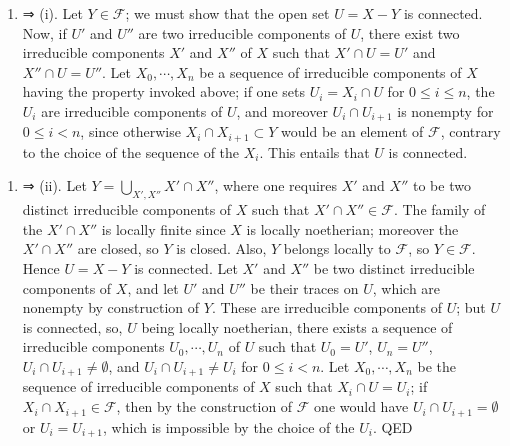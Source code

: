 \documentclass[
  11pt,
  a4paper,
]{book}
\newcounter{none} %
\providecommand{\tightlist}{%
  \setlength{\itemsep}{0pt}\setlength{\parskip}{0pt}}
\begin{document}
\begin{enumerate}
\def\labelenumi{(\roman{enumi})}
\setcounter{enumi}{1}
\tightlist
\item
  ⇒ (i). Let \(Y \in \mathcal{F}\); we must show that the open set
  \(U = X - Y\) is connected. Now, if \(U'\) and \(U''\) are two
  irreducible components of \(U\), there exist two irreducible
  components \(X'\) and \(X''\) of \(X\) such that \(X' \cap U =
  U'\) and \(X'' \cap U = U''\). Let \(X_{0}, \cdots, X_{n}\) be a
  sequence of irreducible components of \(X\) having the property
  invoked above; if one sets \(U_{i} = X_{i} \cap U\) for
  \(0 \leqslant i \leqslant n\), the \(U_{i}\) are irreducible
  components of \(U\), and moreover \(U_{i} \cap U_{i+1}\) is nonempty
  for \(0 \leqslant i < n\), since otherwise \(X_{i} \cap
  X_{i+1} \subset Y\) would be an element of \(\mathcal{F}\), contrary
  to the choice of the sequence of the \(X_{i}\). This entails that
  \(U\) is connected.
\end{enumerate}

\begin{enumerate}
\def\labelenumi{(\roman{enumi})}
\tightlist
\item
  ⇒ (ii). Let \(Y = \bigcup_{X', X''} X' \cap X''\), where one requires
  \(X'\) and \(X''\) to be two distinct irreducible components of \(X\)
  such that \(X' \cap X'' \in \mathcal{F}\). The family of the
  \(X' \cap X''\) is locally finite since \(X\) is locally noetherian;
  moreover the \(X' \cap X''\) are closed, so \(Y\) is closed. Also,
  \(Y\) belongs locally to \(\mathcal{F}\), so \(Y \in \mathcal{F}\).
  Hence \(U = X - Y\) is connected. Let \(X'\) and \(X''\) be two
  distinct irreducible components of \(X\), and let \(U'\) and \(U''\)
  be their traces on \(U\), which are nonempty by construction of \(Y\).
  These are irreducible components of \(U\); but \(U\) is connected, so,
  \(U\) being locally noetherian, there exists a sequence of irreducible
  components \(U_{0}, \cdots, U_{n}\) of \(U\) such that \(U_{0} = U'\),
  \(U_{n} = U''\), \(U_{i} \cap U_{i+1} \neq
  \emptyset\), and \(U_{i} \cap U_{i+1} \neq U_{i}\) for
  \(0 \leqslant i < n\). Let \(X_{0}, \cdots, X_{n}\) be the sequence of
  irreducible components of \(X\) such that \(X_{i} \cap U = U_{i}\); if
  \(X_{i} \cap X_{i+1} \in \mathcal{F}\), then by the construction of
  \(\mathcal{F}\) one would have \(U_{i} \cap U_{i+1} = \emptyset\) or
  \(U_{i} = U_{i+1}\), which is impossible by the choice of the
  \(U_{i}\). QED
\end{enumerate}
\end{document}
